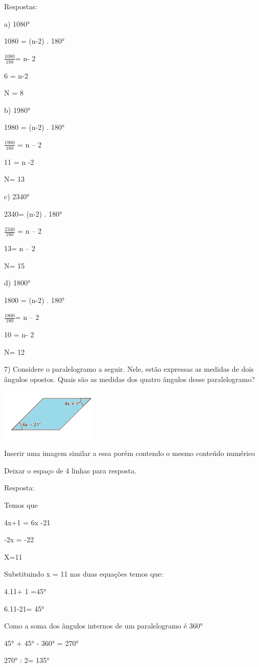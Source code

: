 Respostas:

a) 1080°

1080 = (n-2) . 180°

\(\frac{1080}{180}\)= n- 2

6 = n-2

N = 8

b) 1980°

1980 = (n-2) . 180°

\(\frac{1980}{180}\) = n -- 2

11 = n -2

N= 13

c) 2340°

2340= (n-2) . 180°

\(\frac{2340}{180}\) = n -- 2

13= n -- 2

N= 15

d) 1800°

1800 = (n-2) . 180°

\(\frac{1800}{180}\)= n -- 2

10 = n- 2

N= 12

7) Considere o paralelogramo a seguir. Nele, estão expressas as medidas
de dois ângulos opostos. Quais são as medidas dos quatro ângulos desse
paralelogramo?

\includegraphics[width=1.82292in,height=0.95833in]{./imgSAEB_8_MAT/media/image9.png}

Inserir uma imagem similar a essa porém contendo o mesmo conteúdo
numérico

Deixar o espaço de 4 linhas para resposta.

Resposta:

Temos que

4x+1 = 6x -21

-2x = -22

X=11

Substituindo x = 11 nas duas equações temos que:

4.11+ 1 =45°

6.11-21= 45°

Como a soma dos ângulos internos de um paralelogramo é 360°

45° + 45° - 360° = 270°

270° : 2= 135°

